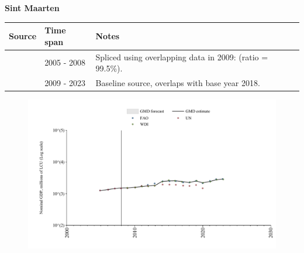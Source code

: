 \documentclass[12pt,a4paper,landscape]{article}
\begin{document}
\begin{adjustbox}{max totalsize={\paperwidth}{\paperheight},center}
\begin{minipage}[t][\textheight][t]{\textwidth}
\vspace*{0.5cm}
{}
\begin{center}
{\Large\bfseries Sint Maarten}
\end{center}
\vspace{0.5cm}
\begin{table}[H]
\centering
\small
\begin{tabular}{|l|l|l|}
\hline
\textbf{Source} & \textbf{Time span} & \textbf{Notes} \\
\hline
\rowcolor{white}\cite{UN}& 2005 - 2008 &Spliced using overlapping data in 2009: (ratio = 99.5\%).\\
\rowcolor{lightgray}\cite{WDI}& 2009 - 2023 &Baseline source, overlaps with base year 2018.\\
\hline
\end{tabular}
\end{table}
\begin{figure}[H]
\centering
\includegraphics[width=\textwidth,height=0.6\textheight,keepaspectratio]{graphs/SXM_nGDP.pdf}
\end{figure}
\end{minipage}
\end{adjustbox}
\end{document}
